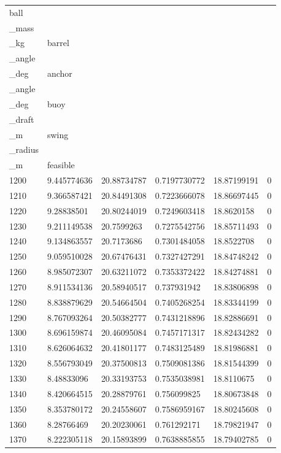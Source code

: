 \begin{longtable}{llllll}
\toprule
ball\\_mass\\_kg & barrel\\_angle\\_deg & anchor\\_angle\\_deg & buoy\\_draft\\_m & swing\\_radius\\_m & feasible \\
\midrule
1200 & 9.445774636 & 20.88734787 & 0.7197730772 & 18.87199191 & 0 \\
1210 & 9.366587421 & 20.84491308 & 0.7223666078 & 18.86697445 & 0 \\
1220 & 9.28838501 & 20.80244019 & 0.7249603418 & 18.8620158 & 0 \\
1230 & 9.211149538 & 20.7599263 & 0.7275542756 & 18.85711493 & 0 \\
1240 & 9.134863557 & 20.7173686 & 0.7301484058 & 18.8522708 & 0 \\
1250 & 9.059510028 & 20.67476431 & 0.7327427291 & 18.84748242 & 0 \\
1260 & 8.985072307 & 20.63211072 & 0.7353372422 & 18.84274881 & 0 \\
1270 & 8.911534136 & 20.58940517 & 0.737931942 & 18.83806898 & 0 \\
1280 & 8.838879629 & 20.54664504 & 0.7405268254 & 18.83344199 & 0 \\
1290 & 8.767093264 & 20.50382777 & 0.7431218896 & 18.82886691 & 0 \\
1300 & 8.696159874 & 20.46095084 & 0.7457171317 & 18.82434282 & 0 \\
1310 & 8.626064632 & 20.41801177 & 0.7483125489 & 18.81986881 & 0 \\
1320 & 8.556793049 & 20.37500813 & 0.7509081386 & 18.81544399 & 0 \\
1330 & 8.48833096 & 20.33193753 & 0.7535038981 & 18.8110675 & 0 \\
1340 & 8.420664515 & 20.28879761 & 0.756099825 & 18.80673848 & 0 \\
1350 & 8.353780172 & 20.24558607 & 0.7586959167 & 18.80245608 & 0 \\
1360 & 8.28766469 & 20.20230061 & 0.761292171 & 18.79821947 & 0 \\
1370 & 8.222305118 & 20.15893899 & 0.7638885855 & 18.79402785 & 0 \\

\end{longtable}
